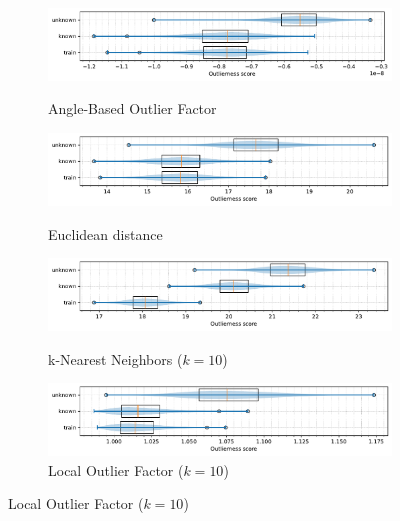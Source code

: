 \begin{figure}[t]
    \centering
    \begin{subfigure}[b]{\textwidth}
        \centering
        \caption{\small Angle-Based Outlier Factor}
        \includegraphics[width=\textwidth]{images/distributions/skew/box-distributions-dimension_250-samples_1000-distance_8-distribution_gaussian-model_ABOF-seed_0.pdf}
        \label{fig:box-abof}
    \end{subfigure}
    \begin{subfigure}[b]{\textwidth}
        \centering
        \caption{\small Euclidean distance}
        \includegraphics[width=\textwidth]{images/distributions/skew/box-distributions-dimension_250-samples_1000-distance_8-distribution_gaussian-model_ED-seed_0.pdf}
        \label{fig:box-ed}
    \end{subfigure}
    \begin{subfigure}[b]{\textwidth}
        \centering
        \caption{\small k-Nearest Neighbors ($k=10$)}
        \includegraphics[width=\textwidth]{images/distributions/skew/box-distributions-dimension_250-samples_1000-distance_8-distribution_gaussian-model_kNN-10-seed_0.pdf}
        \label{fig:box-knn}
    \end{subfigure}
    \begin{subfigure}[b]{\textwidth}
        \centering
        \caption{\small Local Outlier Factor ($k=10$)}
        \includegraphics[width=\textwidth]{images/distributions/skew/box-distributions-dimension_250-samples_1000-distance_8-distribution_gaussian-model_LOF-10-seed_0.pdf}

\end{subfigure}
\end{figure}
